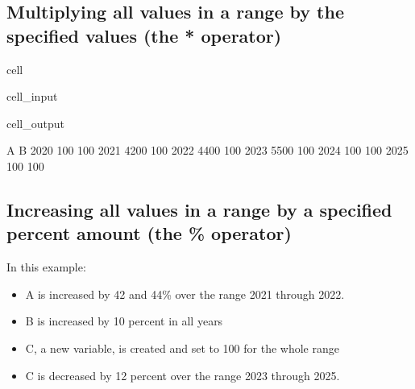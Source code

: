 \documentclass[letterpaper,10pt,english]{jupyterBook}
\begin{document}
\subsection{Multiplying all values in a range by the specified values (the * operator)}
\label{\detokenize{content/04_PythonEssentials/UpdateCommand:multiplying-all-values-in-a-range-by-the-specified-values-the-operator}}
\begin{sphinxuseclass}{cell}\begin{sphinxVerbatimInput}

\begin{sphinxuseclass}{cell_input}
\begin{sphinxVerbatim}[commandchars=\\\{\}]
\end{sphinxVerbatim}

\end{sphinxuseclass}\end{sphinxVerbatimInput}
\begin{sphinxVerbatimOutput}

\begin{sphinxuseclass}{cell_output}
\begin{sphinxVerbatim}[commandchars=\\\{\}]
         A    B
2020   100  100
2021  4200  100
2022  4400  100
2023  5500  100
2024   100  100
2025   100  100
\end{sphinxVerbatim}

\end{sphinxuseclass}\end{sphinxVerbatimOutput}

\end{sphinxuseclass}

\subsection{Increasing all  values in a range by a  specified percent amount (the \% operator)}
\label{\detokenize{content/04_PythonEssentials/UpdateCommand:increasing-all-values-in-a-range-by-a-specified-percent-amount-the-operator}}
\sphinxAtStartPar
In this example:
\begin{itemize}
\item {} 
\sphinxAtStartPar
A is increased by 42 and 44\% over the range 2021 through 2022.

\item {} 
\sphinxAtStartPar
B is increased by 10 percent in all years

\item {} 
\sphinxAtStartPar
C, a new variable, is created and set to 100 for the whole range

\item {} 
\sphinxAtStartPar
C is decreased by 12 percent over the range 2023 through 2025.

\end{itemize}
\end{document}
